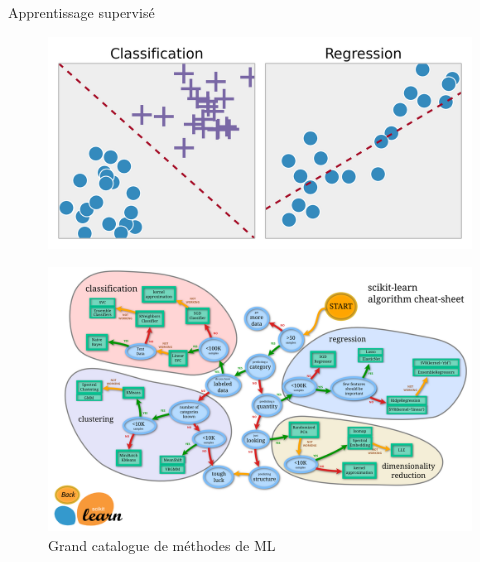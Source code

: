 \documentclass{beamer}
\begin{document}
	\begin{frame}{Apprentissage supervisé}
	\centering
	\begin{figure}[h]
		\includegraphics[width=\linewidth]{CR.png}
	\end{figure}
\end{frame}	



	\begin{frame}
					\centering
	\begin{figure}[h]
			\includegraphics[width=\linewidth]{ml_map.png}
		\caption{Grand catalogue de méthodes de ML}
	\end{figure}
	\end{frame}
\end{document}
